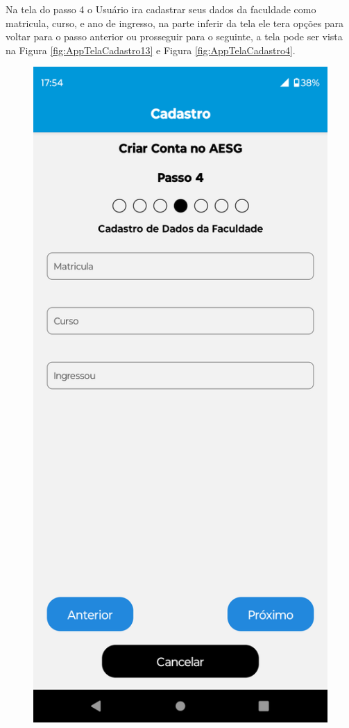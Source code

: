 \documentclass[
    12pt,                   %
    openright,              %
    oneside,                %
    a4paper,                %
    sumario=tradicional,    %
    english,                %
    brazil,                 %
    ]{abntex2}
\begin{document}
            \newpage
            Na tela do passo 4 o Usuário ira cadastrar seus dados da faculdade como matricula, curso, e ano de ingresso, na parte inferir da tela ele tera opções para voltar para o passo anterior ou prosseguir para o seguinte, a tela pode ser vista na Figura \ref{fig:AppTelaCadastro13} e Figura \ref{fig:AppTelaCadastro4}.
            \begin{figure}[!h]          
                \begin{minipage}{0.5\textwidth}
                    \centering
                    \includegraphics[width=0.8\linewidth]{Imagens/App Images User/AUCadastro13.png}

\end{minipage}
\end{figure}
\end{document}

